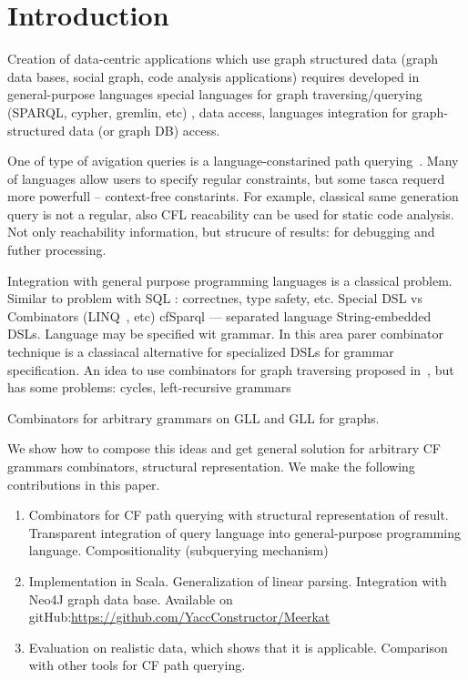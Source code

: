 \section{Introduction}

Creation of data-centric applications which use graph structured data (graph data bases, social graph, code analysis applications) requires 
developed in general-purpose languages 
special languages for graph traversing/querying (SPARQL, cypher, gremlin, etc)
, data access, languages integration for graph-structured data (or graph DB) access.

One of type of avigation queries is a language-constarined path querying~\cite{!!!}.
Many of languages allow users to specify regular constraints, but some tasca requerd more powerfull -- context-free constarints.
For example, classical same generation query is not a regular, also CFL reacability can be used for static code analysis.
Not only reachability information, but strucure of results: for debugging and futher processing.

Integration with general purpose programming languages is a classical problem.
Similar to problem with SQL : correctnes, type safety, etc. Special DSL vs Combinators (LINQ~\cite{LINQ1, LINQ2}, etc)
cfSparql --- separated language
String-embedded DSLs.
Language may be specified wit grammar.
In this area parer combinator technique is a classiacal alternative for specialized DSLs for grammar specification. 
An idea to use combinators for graph traversing proposed in~\cite{ScalaGraphParsing}, but has some problems: cycles, left-recursive grammars

Combinators for arbitrary grammars on GLL and GLL for graphs. 

We show how to compose this ideas and get general solution for arbitrary CF grammars combinators, structural representation.
We make the following contributions in this paper.
\begin{enumerate}
\item Combinators for CF path querying with structural representation of result.
 Transparent integration of query language into general-purpose programming language. Compositionality (subquerying mechanism)
\item Implementation in Scala. Generalization of linear parsing. Integration with Neo4J graph data base. Available on gitHub:\url{https://github.com/YaccConstructor/Meerkat}
\item Evaluation on realistic data, which shows that it is applicable. Comparison  with other tools 
for CF path querying.
\end{enumerate}